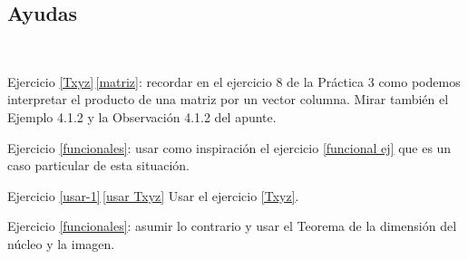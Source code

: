 \subsection*{Ayudas}

\

    Ejercicio \ref{Txyz}\,\ref{matriz}: recordar en el ejercicio 8 de la Práctica 3 como podemos interpretar el producto de una matriz por un vector columna. Mirar también el Ejemplo 4.1.2 y la Observación 4.1.2 del apunte.

    Ejercicio \ref{funcionales}: usar como inspiración el ejercicio     \ref{funcional ej} que es un caso particular de esta situación.

    Ejercicio \ref{usar-1}\,\ref{usar Txyz} Usar el ejercicio     \ref{Txyz}.

    Ejercicio \ref{funcionales}: asumir lo contrario y usar el Teorema de la dimensión del núcleo y la imagen.


